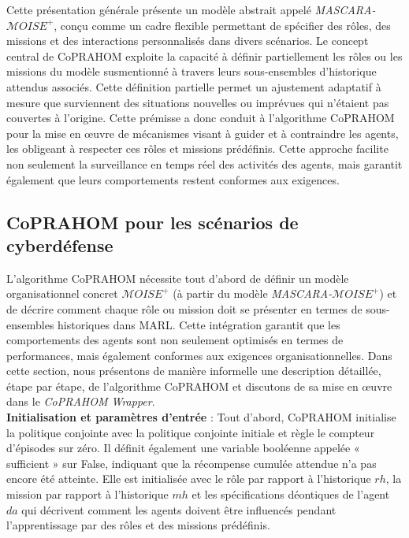 Cette présentation générale présente un modèle abstrait appelé \textit{MASCARA-$\mathcal{M}OISE^+$}, conçu comme un cadre flexible permettant de spécifier des rôles, des missions et des interactions personnalisés dans divers scénarios. Le concept central de CoPRAHOM exploite la capacité à définir partiellement les rôles ou les missions du modèle susmentionné à travers leurs sous-ensembles d'historique attendus associés. Cette définition partielle permet un ajustement adaptatif à mesure que surviennent des situations nouvelles ou imprévues qui n'étaient pas couvertes à l'origine. Cette prémisse a donc conduit à l'algorithme CoPRAHOM pour la mise en œuvre de mécanismes visant à guider et à contraindre les agents, les obligeant à respecter ces rôles et missions prédéfinis. Cette approche facilite non seulement la surveillance en temps réel des activités des agents, mais garantit également que leurs comportements restent conformes aux exigences.


\subsection{CoPRAHOM pour les scénarios de cyberdéfense}

L'algorithme CoPRAHOM nécessite tout d'abord de définir un modèle organisationnel concret $\mathcal{M}OISE^+$ (à partir du modèle \textit{MASCARA-$\mathcal{M}OISE^+$}) et de décrire comment chaque rôle ou mission doit se présenter en termes de sous-ensembles historiques dans MARL.
Cette intégration garantit que les comportements des agents sont non seulement optimisés en termes de performances, mais également conformes aux exigences organisationnelles.
%
Dans cette section, nous présentons de manière informelle une description détaillée, étape par étape, de l'algorithme CoPRAHOM et discutons de sa mise en œuvre dans le \textit{CoPRAHOM Wrapper}.\\

\textbf{Initialisation et paramètres d'entrée} :
Tout d'abord, CoPRAHOM initialise la politique conjointe avec la politique conjointe initiale et règle le compteur d'épisodes sur zéro. Il définit également une variable booléenne appelée « sufficient » sur False, indiquant que la récompense cumulée attendue n'a pas encore été atteinte. Elle est initialisée avec le rôle par rapport à l'historique $rh$, la mission par rapport à l'historique $mh$ et les spécifications déontiques de l'agent $da$ qui décrivent comment les agents doivent être influencés pendant l'apprentissage par des rôles et des missions prédéfinis.

